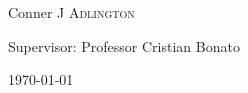 \begin{titlepage}
\begin{minipage}{0.8\textwidth}
    \large
    \begin{center}    
Conner J \textsc{Adlington}\\ %
\hspace{1cm}

Supervisor: Professor Cristian Bonato\\
\hspace{1cm}

\end{center}
\end{minipage}



{\large \today}\\[2cm] %

\vfill %

\end{titlepage}



